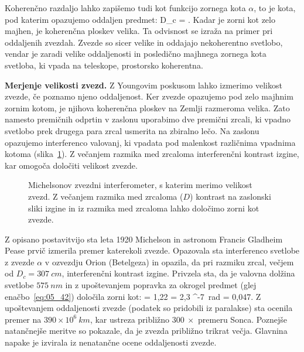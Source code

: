 Koherenčno razdaljo lahko zapišemo tudi kot funkcijo zornega kota $\alpha$, to je kota, pod 
katerim opazujemo oddaljen predmet:
\beq
D_c = \frac{\lambda}{\alpha}.
\label{eq:08_32}
\eeq
Kadar je zorni kot zelo majhen, je koherenčna ploskev velika. Ta odvisnost se izraža na primer
pri oddaljenih zvezdah. Zvezde so sicer velike in oddajajo nekoherentno svetlobo, vendar je 
zaradi velike oddaljenosti in posledično majhnega zornega kota svetloba, ki vpada 
na teleskope, prostorsko koherentna.

\begin{example}{\bf Merjenje velikosti zvezd.}
Z Youngovim poskusom lahko izmerimo velikost zvezde, če poznamo njeno oddaljenost. 
Ker zvezde opazujemo pod zelo majhnim zornim kotom, je njihova koherenčna ploskev
na Zemlji razmeroma velika. Zato namesto premičnih odprtin v zaslonu uporabimo dve 
premični zrcali, ki vpadno svetlobo prek drugega para zrcal usmerita na zbiralno lečo.
Na zaslonu opazujemo interferenco valovanj, ki vpadata pod malenkost različnima vpadnima kotoma
(slika~\ref{fig:08_Stellar}). Z večanjem razmika med zrcaloma interferenčni kontrast izgine, kar
omogoča določiti velikost zvezde.
\begin{figure}[h]
\centering
\def\svgwidth{80truemm} 

\caption{Michelsonov zvezdni interferometer, s katerim merimo velikost zvezd. 
Z večanjem razmika med zrcaloma ($D$) kontrast na zaslonski sliki izgine in iz razmika med zrcaloma 
lahko določimo zorni kot zvezde.}
\label{fig:08_Stellar}
\end{figure}

Z opisano postavitvijo sta leta 1920 Michelson in astronom Francis Gladheim Pease
prvič izmerila premer katerekoli zvezde. Opazovala sta interferenco svetlobe z 
zvezde $\alpha$ v ozvezdju Orion (Betelgeza) in opazila, da pri razmiku zrcal, večjem
od $D_c = 307~\si{cm}$, interferenčni kontrast izgine. Privzela sta, da je valovna dolžina
svetlobe $575~\si{nm}$ in z upoštevanjem popravka za okrogel predmet (glej enačbo~\ref{eq:05_42}) 
določila zorni kot:
\beq
\alpha = 1,22  = 2,3 ^{-7}~\si{\radian} = 0,047\si{\arcsec}.
\label{eq:08_33}
\eeq
Z upoštevanjem oddaljenosti zvezde (podatek so pridobili iz paralakse) sta ocenila premer
na $390 \times 10^6~\si{km}$, kar ustreza približno $300~\times$ premeru Sonca. Poznejše 
natančnejše meritve so pokazale, da je zvezda približno trikrat večja. Glavnina napake je 
izvirala iz nenatančne ocene oddaljenosti zvezde. 
\end{example}

